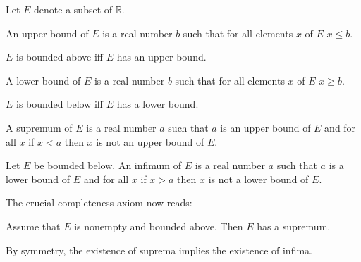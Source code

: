 \documentclass{article}
\begin{document}
\begin{forthel}

Let $E$ denote a subset of $\mathbb{R}$.

\begin{definition}
An upper bound of $E$ is a
real number $b$ such that for all elements $x$ of $E$ $x \leq b$.
\end{definition}

\begin{definition}
$E$ is bounded above iff
$E$ has an upper bound.
\end{definition}

\begin{definition}
A lower bound of $E$ is a
real number $b$ such that for all elements $x$ of $E$ $x \geq b$.
\end{definition}

\begin{definition}
$E$ is bounded below iff
$E$ has a lower bound.
\end{definition}

\begin{definition}
A supremum of $E$ is a real number $a$ such that
$a$ is an upper bound of $E$ and for all $x$ if $x < a$ then $x$
is not an upper bound of $E$.
\end{definition}

\begin{definition}
Let $E$ be bounded below.
An infimum of $E$ is a real number $a$ such that
$a$ is a lower bound of $E$ and for all $x$ if $x > a$ then $x$ is
not a lower bound of $E$.
\end{definition}
\end{forthel}
%
The crucial completeness axiom now reads:
%
\begin{forthel}
\begin{axiom}
Assume that $E$ is nonempty and bounded above.
Then $E$ has a supremum.
\end{axiom}
\end{forthel}
%
By symmetry, the existence of suprema implies the existence 
of infima.
%
\end{document}
